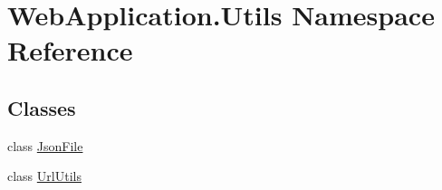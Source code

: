 \hypertarget{namespaceWebApplication_1_1Utils}{}\section{Web\+Application.\+Utils Namespace Reference}
\label{namespaceWebApplication_1_1Utils}
\subsection*{Classes}
\begin{DoxyCompactItemize}
\item 
class \mbox{\hyperlink{classWebApplication_1_1Utils_1_1JsonFile}{Json\+File}}
\item 
class \mbox{\hyperlink{classWebApplication_1_1Utils_1_1UrlUtils}{Url\+Utils}}
\end{DoxyCompactItemize}
